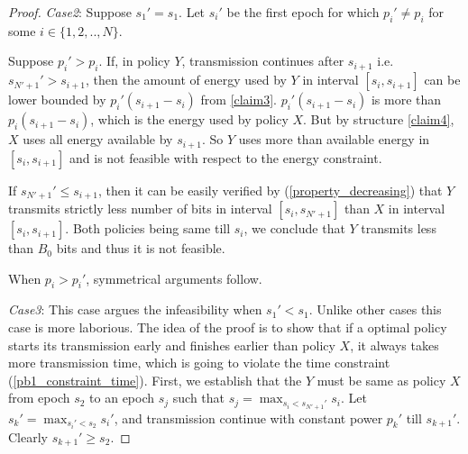 \begin{proof}
\textit{Case2}: Suppose $s_1'=s_1$. Let $s_i'$ be the first epoch for which $p_i'\ne p_i$ for some $i \in \{1,2,..,N\}$. 


Suppose $p_i'>p_i$. If, in policy $Y$, transmission continues after $s_{i+1}$ i.e. $s_{N'+1}'>s_{i+1}$, then the amount of energy used by $Y$ in interval $[s_{i},s_{i+1}]$ can be lower bounded by $p_i'(s_{i+1}-s_i)$ from \eqref{claim3}. $p_i'(s_{i+1}-s_i)$ is more than $p_i(s_{i+1}-s_i)$, which is the energy used by policy $X$. But by structure \eqref{claim4}, $X$ uses all energy available by $s_{i+1}$. So $Y$ uses more than available energy in $[s_{i},s_{i+1}]$ and is not feasible with respect to the energy constraint. 

If $s_{N'+1}'\le s_{i+1}$, then it can be easily verified by (\ref{property_decreasing}) that $Y$ transmits strictly less number of bits in interval $[s_i,s_{N'+1}]$ than $X$ in interval $[s_{i},s_{i+1}]$. Both policies being same till $s_i$, we conclude that $Y$ transmits less than $B_0$ bits and thus it is not feasible.

When $p_i>p_i'$, symmetrical arguments follow.

\textit{Case3}: This case argues the infeasibility when $s_1'<s_1$. Unlike other cases this case is more laborious. The idea of the proof is to show that if a optimal policy starts its transmission early and finishes earlier than policy $X$, it always takes more transmission time, which is going to violate the time constraint (\ref{pb1_constraint_time}). First, we establish that the $Y$ must be same as policy $X$ from epoch $s_2$ to an epoch $s_j$ such that $s_j=\displaystyle\max_{s_i<s_{N'+1}'} s_i$. Let $s_k'=\displaystyle\max_{s_i'<s_2}s_i'$, and transmission continue with constant power $p_k'$ till $s_{k+1}'$. Clearly $s_{k+1}'\ge s_2$. 


\end{proof}
